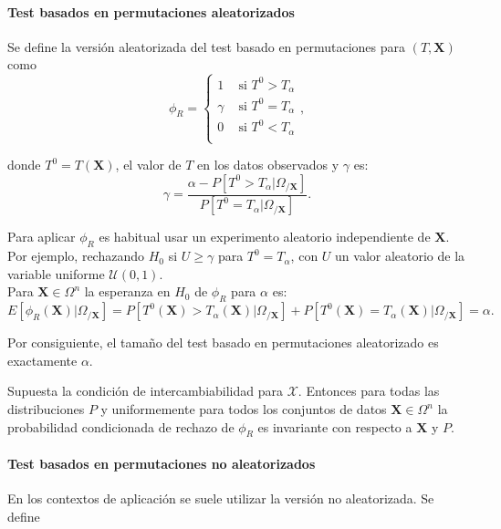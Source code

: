 \paragraph{Test basados en permutaciones aleatorizados}

	Se define la versión aleatorizada del test basado en 
permutaciones para $(T, \mathbf{X})$ como 
	\[ 
		\phi_R = \left\lbrace \begin{array}{cc}
			1 		& \text{ si } T^0 > T_\alpha \\
			\gamma 	& \text{ si } T^0 = T_\alpha \\
			0		& \text{ si } T^0 < T_\alpha \\
		\end{array} \right. ,
	\]
	
	donde $T^0 = T(\mathbf{X})$, el valor de $T$ en los datos 
observados y $\gamma$ es:
	\[
		\gamma = \frac{\alpha - P[T^0 > T_\alpha | 
								\Omega_{/\mathbf{X}}]}
					  {P[T^0 = T_\alpha | 
								\Omega_{/\mathbf{X}}]} .
	\]
	
	Para aplicar $\phi_R$ es habitual usar un experimento 
aleatorio independiente de $\mathbf{X}$. Por ejemplo, 
rechazando $H_0$ si $U \geq \gamma$ para $T^0 = T_\alpha$, 
con $U$ un valor aleatorio de la variable uniforme 
$\mathcal{U}(0,1)$.\\
	Para $\mathbf{X} \in \Omega^n$ la esperanza en $H_0$ de 
$\phi_R$ para $\alpha$ es:
	\[ 
		E[ \phi_R(\mathbf{X}) | \Omega_{/\mathbf{X}}] =
			P[ T^0(\mathbf{X}) > T_\alpha(\mathbf{X}) | 
								\Omega_{/\mathbf{X}}] + 
			P[ T^0(\mathbf{X}) = T_\alpha(\mathbf{X}) | 
								\Omega_{/\mathbf{X}}] =
			\alpha .
	\]
	
	Por consiguiente, el tamaño del test basado en 
permutaciones aleatorizado es exactamente $\alpha$.
	
\begin{proposicion}
	Supuesta la condición de intercambiabilidad para 
$\mathcal{X}$. Entonces para todas las distribuciones $P$ y 
uniformemente para todos los conjuntos de datos $\mathbf{X} 
\in \Omega^n$ la probabilidad condicionada de rechazo de 
$\phi_R$ es invariante con respecto a $\mathbf{X}$ y $P$.
\end{proposicion}

\paragraph{Test basados en permutaciones no aleatorizados}

	En los contextos de aplicación se suele utilizar la 
versión no aleatorizada. Se define
	
